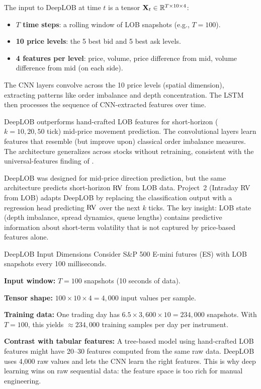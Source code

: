 \begin{definition}
The input to DeepLOB at time $t$ is a tensor $\mathbf{X}_t \in \mathbb{R}^{T \times 10 \times 4}$:
\begin{itemize}[nosep]
  \item \textbf{$T$ time steps}: a rolling window of LOB snapshots (e.g., $T = 100$).
  \item \textbf{10 price levels}: the 5 best bid and 5 best ask levels.
  \item \textbf{4 features per level}: price, volume, price difference from mid, volume difference from mid (on each side).
\end{itemize}
The CNN layers convolve across the 10 price levels (spatial dimension), extracting patterns like order imbalance and depth concentration.
The LSTM then processes the sequence of CNN-extracted features over time.
\end{definition}

\begin{keyresult}
DeepLOB outperforms hand-crafted LOB features for short-horizon ($k = 10, 20, 50$ tick) mid-price movement prediction.
The convolutional layers learn features that resemble (but improve upon) classical order imbalance measures.
The architecture generalizes across stocks without retraining, consistent with the universal-features finding of \citet{SirignanoCont2019}.
\end{keyresult}

\begin{application}
DeepLOB was designed for mid-price direction prediction, but the same architecture predicts short-horizon $\operatorname{RV}$ from LOB data.
Project~2 (Intraday RV from LOB) adapts DeepLOB by replacing the classification output with a regression head predicting $\operatorname{RV}$ over the next $k$ ticks.
The key insight: LOB state (depth imbalance, spread dynamics, queue lengths) contains predictive information about short-term volatility that is not captured by price-based features alone.
\end{application}

\begin{workedexample}{DeepLOB Input Dimensions}
Consider S\&P 500 E-mini futures (ES) with LOB snapshots every 100 milliseconds.

\textbf{Input window:} $T = 100$ snapshots (10 seconds of data).

\textbf{Tensor shape:} $100 \times 10 \times 4 = 4{,}000$ input values per sample.

\textbf{Training data:} One trading day has $6.5 \times 3{,}600 \times 10 = 234{,}000$ snapshots.
With $T = 100$, this yields $\approx 234{,}000$ training samples per day per instrument.

\textbf{Contrast with tabular features:} A tree-based model using hand-crafted LOB features might have 20--30 features computed from the same raw data.
DeepLOB uses 4,000 raw values and lets the CNN learn the right features.
This is why deep learning wins on raw sequential data: the feature space is too rich for manual engineering.
\end{workedexample}


